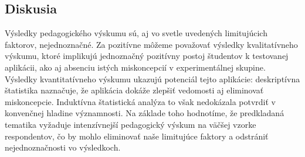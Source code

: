 \subsection{Diskusia}
Výsledky pedagogického výskumu sú, aj vo svetle uvedených limitujúcich faktorov, nejednoznačné. Za pozitívne môžeme považovať výsledky kvalitatívneho výskumu, ktoré implikujú jednoznačný pozitívny postoj študentov 
k testovanej aplikácii, ako aj absenciu istých miskoncepcií v experimentálnej skupine. Výsledky kvantitatívneho výskumu ukazujú potenciál tejto aplikácie: deskriptívna štatistika naznačuje, že aplikácia dokáže zlepšiť
vedomosti aj eliminovať miskoncepcie. Induktívna štatistická analýza to však nedokázala potvrdiť v konvenčnej hladine významnosti. Na základe toho hodnotíme, že predkladaná tematika vyžaduje intenzívnejší pedagogický 
výskum na väčšej vzorke respondentov, čo by mohlo eliminovať naše limitujúce faktory a odstrániť nejednoznačnosti vo výsledkoch.